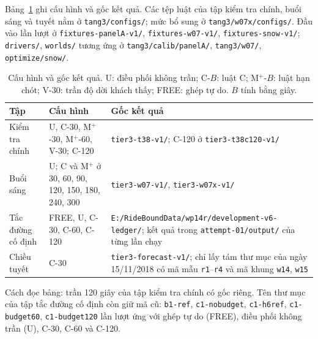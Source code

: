 Bảng~\ref{bang:pl-goc} ghi cấu hình và gốc kết quả. Các tệp luật của tập kiểm tra chính, buổi sáng và tuyết nằm ở \nolinkurl{tang3/configs/}; mức bổ sung ở \nolinkurl{tang3/w07x/configs/}. Đầu vào lần lượt ở \nolinkurl{fixtures-panelA-v1/}, \nolinkurl{fixtures-w07-v1/}, \nolinkurl{fixtures-snow-v1/}; \nolinkurl{drivers/}, \nolinkurl{worlds/} tương ứng ở \nolinkurl{tang3/calib/panelA/}, \nolinkurl{tang3/w07/}, \nolinkurl{optimize/snow/}.

\begin{table}[htbp]
\centering
\caption[Cấu hình và gốc kết quả]{Cấu hình và gốc kết quả. U: điều phối không trần; C-$B$: luật C; M$^+$-$B$: luật hạn chót; V-30: trần độ dời khách thấy; FREE: ghép tự do. $B$ tính bằng giây.}
\label{bang:pl-goc}
\small
\begin{tabular}{@{}>{\raggedright\arraybackslash}p{2.8cm}>{\raggedright\arraybackslash}p{5.2cm}>{\raggedright\arraybackslash}p{6.8cm}@{}}
\toprule
\textbf{Tập} & \textbf{Cấu hình} & \textbf{Gốc kết quả} \\
\midrule
Kiểm tra chính & U, C-30, M$^+$-30, M$^+$-60, V-30; C-120 & \nolinkurl{tier3-t38-v1/}; C-120 ở \nolinkurl{tier3-t38c120-v1/} \\
Buổi sáng & U; C và M$^+$ ở 30, 60, 90, 120, 150, 180, 240, 300 & \nolinkurl{tier3-w07-v1/}, \nolinkurl{tier3-w07x-v1/} \\
Tắc đường cố định & FREE, U, C-30, C-60, C-120 & \nolinkurl{E:/RideBoundData/wp14r/development-v6-ledger/}; kết quả trong \nolinkurl{attempt-01/output/} của từng lần chạy \\
Chiều tuyết & C-30 & \nolinkurl{tier3-forecast-v1/}; chỉ lấy tám thư mục của ngày 15/11/2018 có mã mẫu \texttt{r1}--\texttt{r4} và mã khung \texttt{w14}, \texttt{w15} \\
\bottomrule
\end{tabular}
\end{table}

Cách đọc bảng: trần 120 giây của tập kiểm tra chính có gốc riêng. Tên thư mục của tập tắc đường cố định còn giữ mã cũ: \nolinkurl{b1-ref}, \nolinkurl{c1-nobudget}, \nolinkurl{c1-h6ref}, \nolinkurl{c1-budget60}, \nolinkurl{c1-budget120} lần lượt ứng với ghép tự do (FREE), điều phối không trần (U), C-30, C-60 và C-120.

